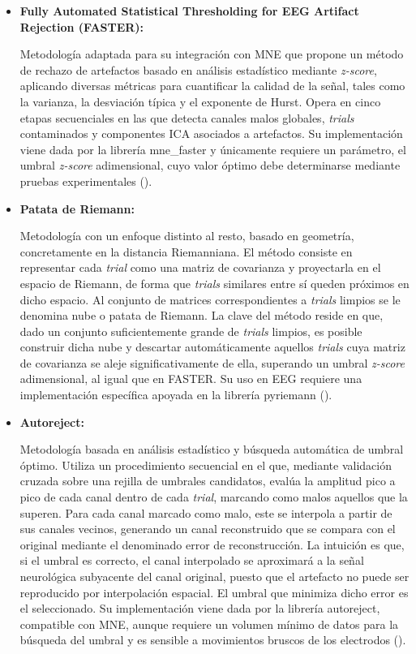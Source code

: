 \begin{itemize}
    \item \textbf{Fully Automated Statistical Thresholding for EEG Artifact Rejection (FASTER):}

        Metodología adaptada para su integración con MNE que propone un método de rechazo de artefactos basado en análisis estadístico mediante \textit{z-score}, aplicando diversas métricas para cuantificar la calidad de la señal, tales como la varianza, la desviación típica y el exponente de Hurst. Opera en cinco etapas secuenciales en las que detecta canales malos globales, \textit{trials} contaminados y componentes ICA asociados a artefactos. Su implementación viene dada por la librería mne\_faster y únicamente requiere un parámetro, el umbral \textit{z-score} adimensional, cuyo valor óptimo debe determinarse mediante pruebas experimentales (\cite{nolan2010faster}).
    
    \item \textbf{Patata de Riemann:}

        Metodología con un enfoque distinto al resto, basado en geometría, concretamente en la distancia Riemanniana. El método consiste en representar cada \textit{trial} como una matriz de covarianza y proyectarla en el espacio de Riemann, de forma que \textit{trials} similares entre sí queden próximos en dicho espacio. Al conjunto de matrices correspondientes a \textit{trials} limpios se le denomina nube o patata de Riemann. La clave del método reside en que, dado un conjunto suficientemente grande de \textit{trials} limpios, es posible construir dicha nube y descartar automáticamente aquellos \textit{trials} cuya matriz de covarianza se aleje significativamente de ella, superando un umbral \textit{z-score} adimensional, al igual que en FASTER. Su uso en EEG requiere una implementación específica apoyada en la librería pyriemann (\cite{hajhassani2026improved}).

    \item \textbf{Autoreject:}

        Metodología basada en análisis estadístico y búsqueda automática de umbral óptimo. Utiliza un procedimiento secuencial en el que, mediante validación cruzada sobre una rejilla de umbrales candidatos, evalúa la amplitud pico a pico de cada canal dentro de cada \textit{trial}, marcando como malos aquellos que la superen. Para cada canal marcado como malo, este se interpola a partir de sus canales vecinos, generando un canal reconstruido que se compara con el original mediante el denominado error de reconstrucción. La intuición es que, si el umbral es correcto, el canal interpolado se aproximará a la señal neurológica subyacente del canal original, puesto que el artefacto no puede ser reproducido por interpolación espacial. El umbral que minimiza dicho error es el seleccionado. Su implementación viene dada por la librería autoreject, compatible con MNE, aunque requiere un volumen mínimo de datos para la búsqueda del umbral y es sensible a movimientos bruscos de los electrodos (\cite{jas2017autoreject}).

\end{itemize}


